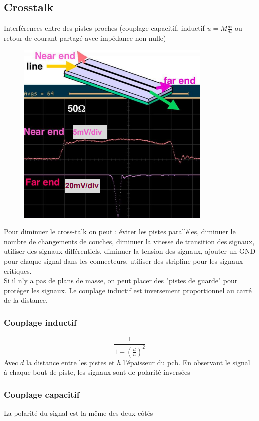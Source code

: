 \documentclass[resume]{subfiles}
\begin{document}
\begin{multicols}{3}
\subsection{Crosstalk}
Interférences entre des pistes proches (couplage capacitif, inductif $u=M\frac{di}{dt}$ ou retour de courant partagé avec impédance non-nulle)
\begin{figure}[H]
\centering
\includegraphics[width=0.9\columnwidth]{img_20.png}
\end{figure}
Pour diminuer le cross-talk on peut : éviter les pistes parallèles, diminuer le nombre de changements de couches, diminuer la vitesse de transition des signaux, utiliser des signaux différentiels, diminuer la tension des signaux, ajouter un GND pour chaque signal dans les connecteurs, utiliser des stripline pour les signaux critiques.\\
Si il n'y a pas de plans de masse, on peut placer des "pistes de guarde" pour protéger les signaux. Le couplage inductif est inversement proportionnel au carré de la distance.
\subsubsection{Couplage inductif}
$$\frac{1}{1+(\frac{d}{h})^{2}}$$
Avec $d$ la distance entre les pistes et $h$ l'épaisseur du pcb. En observant le signal à chaque bout de piste, les signaux sont de polarité inversées
\subsubsection{Couplage capacitif}
La polarité du signal est la même des deux côtés

\end{multicols}
\end{document}
